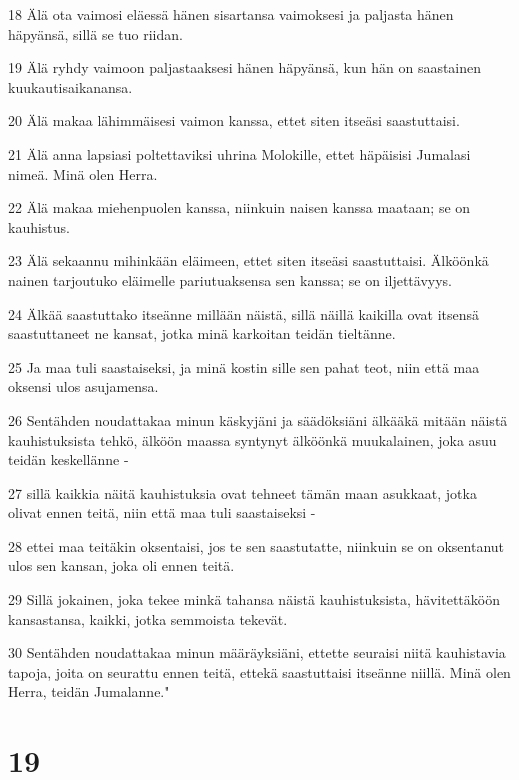 \par 18 Älä ota vaimosi eläessä hänen sisartansa vaimoksesi ja paljasta hänen häpyänsä, sillä se tuo riidan.
\par 19 Älä ryhdy vaimoon paljastaaksesi hänen häpyänsä, kun hän on saastainen kuukautisaikanansa.
\par 20 Älä makaa lähimmäisesi vaimon kanssa, ettet siten itseäsi saastuttaisi.
\par 21 Älä anna lapsiasi poltettaviksi uhrina Molokille, ettet häpäisisi Jumalasi nimeä. Minä olen Herra.
\par 22 Älä makaa miehenpuolen kanssa, niinkuin naisen kanssa maataan; se on kauhistus.
\par 23 Älä sekaannu mihinkään eläimeen, ettet siten itseäsi saastuttaisi. Älköönkä nainen tarjoutuko eläimelle pariutuaksensa sen kanssa; se on iljettävyys.
\par 24 Älkää saastuttako itseänne millään näistä, sillä näillä kaikilla ovat itsensä saastuttaneet ne kansat, jotka minä karkoitan teidän tieltänne.
\par 25 Ja maa tuli saastaiseksi, ja minä kostin sille sen pahat teot, niin että maa oksensi ulos asujamensa.
\par 26 Sentähden noudattakaa minun käskyjäni ja säädöksiäni älkääkä mitään näistä kauhistuksista tehkö, älköön maassa syntynyt älköönkä muukalainen, joka asuu teidän keskellänne -
\par 27 sillä kaikkia näitä kauhistuksia ovat tehneet tämän maan asukkaat, jotka olivat ennen teitä, niin että maa tuli saastaiseksi -
\par 28 ettei maa teitäkin oksentaisi, jos te sen saastutatte, niinkuin se on oksentanut ulos sen kansan, joka oli ennen teitä.
\par 29 Sillä jokainen, joka tekee minkä tahansa näistä kauhistuksista, hävitettäköön kansastansa, kaikki, jotka semmoista tekevät.
\par 30 Sentähden noudattakaa minun määräyksiäni, ettette seuraisi niitä kauhistavia tapoja, joita on seurattu ennen teitä, ettekä saastuttaisi itseänne niillä. Minä olen Herra, teidän Jumalanne."

\chapter{19}


